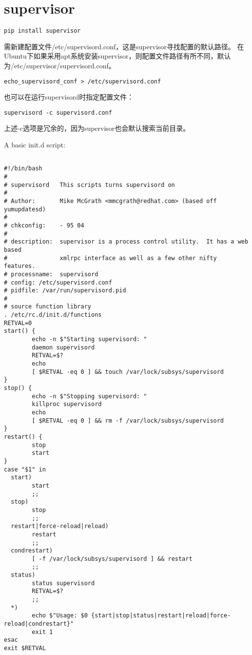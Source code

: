 \section{supervisor}


\begin{verbatim}
pip install supervisor 
\end{verbatim}

需新建配置文件/etc/supervisord.conf，这是supervisor寻找配置的默认路径。
在Ubuntu下如果采用apt系统安装supervisor，则配置文件路径有所不同，默认为/etc/supervisor/supervisord.conf。

\begin{verbatim}
echo_supervisord_conf > /etc/supervisord.conf
\end{verbatim}

也可以在运行supervisord时指定配置文件：
\begin{verbatim}
supervisord -c supervisord.conf
\end{verbatim}
上述-c选项是冗余的，因为supervisor也会默认搜索当前目录。


A basic init.d script:

\begin{lstlisting}

#!/bin/bash
#
# supervisord   This scripts turns supervisord on
#
# Author:       Mike McGrath <mmcgrath@redhat.com> (based off yumupdatesd)
#
# chkconfig:    - 95 04
#
# description:  supervisor is a process control utility.  It has a web based
#               xmlrpc interface as well as a few other nifty features.
# processname:  supervisord
# config: /etc/supervisord.conf
# pidfile: /var/run/supervisord.pid
#
# source function library
. /etc/rc.d/init.d/functions
RETVAL=0
start() {
        echo -n $"Starting supervisord: "
        daemon supervisord
        RETVAL=$?
        echo
        [ $RETVAL -eq 0 ] && touch /var/lock/subsys/supervisord
}
stop() {
        echo -n $"Stopping supervisord: "
        killproc supervisord
        echo
        [ $RETVAL -eq 0 ] && rm -f /var/lock/subsys/supervisord
}
restart() {
        stop
        start
}
case "$1" in
  start)
        start
        ;;
  stop)
        stop
        ;;
  restart|force-reload|reload)
        restart
        ;;
  condrestart)
        [ -f /var/lock/subsys/supervisord ] && restart
        ;;
  status)
        status supervisord
        RETVAL=$?
        ;;
  *)
        echo $"Usage: $0 {start|stop|status|restart|reload|force-reload|condrestart}"
        exit 1
esac
exit $RETVAL
\end{lstlisting}

